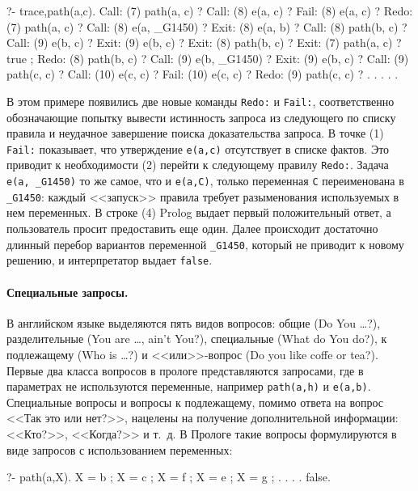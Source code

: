 \documentclass[a4paper,14pt, openany, twoside, final]{extbook} %
\begin{document}
\begin{proexp}
?- trace,path(a,c).
   Call: (7) path(a, c) ?
   Call: (8) e(a, c) ?
   Fail: (8) e(a, c) ?        %
   Redo: (7) path(a, c) ?     %
   Call: (8) e(a, _G1450) ?   %
   Exit: (8) e(a, b) ?
   Call: (8) path(b, c) ?
   Call: (9) e(b, c) ?
   Exit: (9) e(b, c) ?
   Exit: (8) path(b, c) ?
   Exit: (7) path(a, c) ?
true ;                        %
   Redo: (8) path(b, c) ?
   Call: (9) e(b, _G1450) ?
   Exit: (9) e(b, c) ?
   Call: (9) path(c, c) ?
   Call: (10) e(c, c) ?
   Fail: (10) e(c, c) ?
   Redo: (9) path(c, c) ?     %
   . . . . .
\end{proexp}


В этом примере появились две новые команды \texttt{Redo:} и \texttt{Fail:}, соответственно обозначающие попытку вывести истинность запроса из следующего по списку правила и неудачное завершение поиска доказательства запроса.  В точке (1) \texttt{Fail:} показывает, что утверждение \texttt{e(a,c)} отсутствует в списке фактов.  Это приводит к необходимости (2) перейти к следующему правилу \texttt{Redo:}.  Задача \texttt{e(a, \_G1450)} то же самое, что и \texttt{e(a,C)}, только переменная \texttt{C} переименована в \texttt{\_G1450}: каждый <<запуск>> правила требует разыменования используемых в нем переменных.  В строке (4) Prolog выдает первый положительный ответ, а пользователь просит предоставить еще один.  Далее происходит достаточно длинный перебор вариантов переменной \texttt{\_G1450}, который не приводит к новому решению, и интерпретатор выдает \texttt{false}.

\paragraph{Специальные запросы.} В английском языке выделяются пять видов вопросов: общие (Do You \ldots{}?), разделительные (You are \ldots{}, ain't You?), специальные (What do You do?), к подлежащему (Who is \ldots{}?) и <<или>>-вопрос (Do you like coffe or tea?).  Первые два класса вопросов в прологе представляются запросами, где в параметрах не используются переменные, например \texttt{path(a,h)} и \texttt{e(a,b)}.  Специальные вопросы и вопросы к подлежащему, помимо ответа на вопрос <<Так это или нет?>>, нацелены на получение дополнительной информации: <<Кто?>>, <<Когда?>> и т.~д.  В Прологе такие вопросы формулируются в виде запросов с использованием переменных:

\begin{proexp}
?- path(a,X).
X = b ;
X = c ;
X = f ;
X = e ;
X = g ;
. . . .
false.
\end{proexp}
\end{document}
